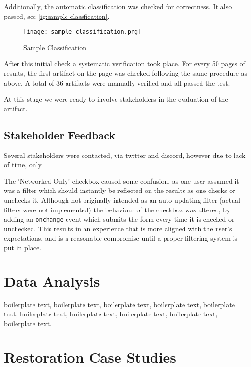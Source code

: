 Additionally, the automatic classification was checked for correctness. It also passed, see \autoref{ig:sample-classfication}.

\begin{figure}[h]
    \centering
    \texttt{[image: sample-classification.png]}
    \caption[Sample Classification]{Sample Classification}
    \label{fig:sample-classfication}
\end{figure}


After this initial check a systematic verification took place. For every 50 pages of results, the first artifact on the page was checked following the same procedure as above. A total of 36 artifacts were manually verified and all passed the test.

At this stage we were ready to involve stakeholders in the evaluation of the artifact.


\subsection{Stakeholder Feedback}

Several stakeholders were contacted, via twitter and discord, however due to lack of time, only 

The 'Networked Only' checkbox caused some confusion, as one user assumed it was a filter which should instantly be reflected on the results as one checks or unchecks it. Although not originally intended as an auto-updating filter (actual filters were not implemented) the behaviour of the checkbox was altered, by adding an \texttt{onchange} event which submits the form every time it is checked or unchecked. This results in an experience that is more aligned with the user's expectations, and is a reasonable compromise until a proper filtering system is put in place.




\section{Data Analysis}

boilerplate text, boilerplate text, boilerplate text, boilerplate text, boilerplate text, boilerplate text, boilerplate text, boilerplate text, boilerplate text, boilerplate text.


\section{Restoration Case Studies}

